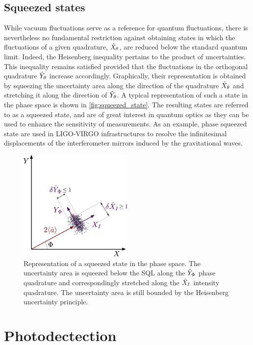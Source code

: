 \subsection{Squeezed states}
While vacuum fluctuations serve as a reference for quantum fluctuations, there is nevertheless no fundamental restriction against obtaining states in which the fluctuations of a given quadrature, $\hat{X}_{\theta}$, are reduced below the standard quantum limit. Indeed, the Heisenberg inequality pertains to the product of uncertainties.
 This inequality remains satisfied provided that the fluctuations in the orthogonal quadrature $\hat{Y}_{\theta}$ increase accordingly. Graphically, their representation is obtained by squeezing the uncertainty area along the direction of the quadrature $\hat{X}_{\theta}$ and stretching it along the direction of $\hat{Y}_{\theta}$. A typical representation of such a state in the phase space is shown in \autoref{fig:squeezed_state}. The resulting states are referred to as a squeezed state, and are of great interest 
 in quantum optics as they can be used to enhance the sensitivity of measurements. As an example, phase squeezed state are used in LIGO-VIRGO infrastructures to resolve the infinitesimal displacements of the interferometer mirrors induced by the gravitational waves.

\begin{figure}
    \centering
    \includegraphics[width=0.5\textwidth]{chap_correlation/fig/fresnel_squeezed.pdf}
    \caption{Representation of a squeezed state in the phase space. The uncertainty area is squeezed below the SQL along the $\hat{Y}_{\Phi}$ phase quadrature and correspondingly stretched along the $\hat{X}_{I}$ intensity quadrature. The uncertainty area is still bounded by the Heisenberg uncertainty principle.}
\end{figure}



\section{Photodectection}
\label{sec:photodetection}


